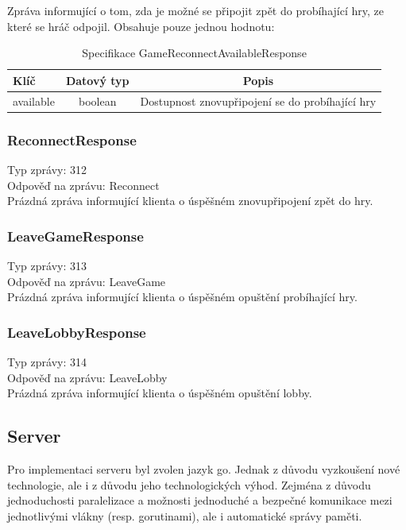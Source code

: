 \documentclass[12pt, a4paper]{article}
\begin{document}
    Zpráva informující o tom, zda je možné se připojit zpět do probíhající hry, ze které se hráč odpojil. Obsahuje pouze jednou hodnotu:

    \begin{table}[H]
        \centering
        \begin{tabular}{|l|c|c|}
            \hline
            Klíč & Datový typ & Popis\\
            \hline
            \hline
            available & boolean & Dostupnost znovupřipojení se do probíhající hry\\
            \hline
        \end{tabular}
        \caption{Specifikace GameReconnectAvailableResponse}
    \end{table}

    \subsubsection*{ReconnectResponse}
    Typ zprávy: 312\\
    Odpověď na zprávu: Reconnect\\

    Prázdná zpráva informující klienta o úspěšném znovupřipojení zpět do hry.


    \subsubsection*{LeaveGameResponse}
    Typ zprávy: 313\\
    Odpověď na zprávu: LeaveGame\\

    Prázdná zpráva informující klienta o úspěšném opuštění probíhající hry.

    \subsubsection*{LeaveLobbyResponse}
    Typ zprávy: 314\\
    Odpověď na zprávu: LeaveLobby\\

    Prázdná zpráva informující klienta o úspěšném opuštění lobby.


    \subsection{Server}
    Pro implementaci serveru byl zvolen jazyk go.
    Jednak z důvodu vyzkoušení nové technologie, ale i z důvodu jeho technologických výhod.
    Zejména z důvodu jednoduchosti paralelizace a možnosti jednoduché a bezpečné komunikace mezi jednotlivými vlákny (resp. gorutinami), ale i automatické správy paměti.
\end{document}
